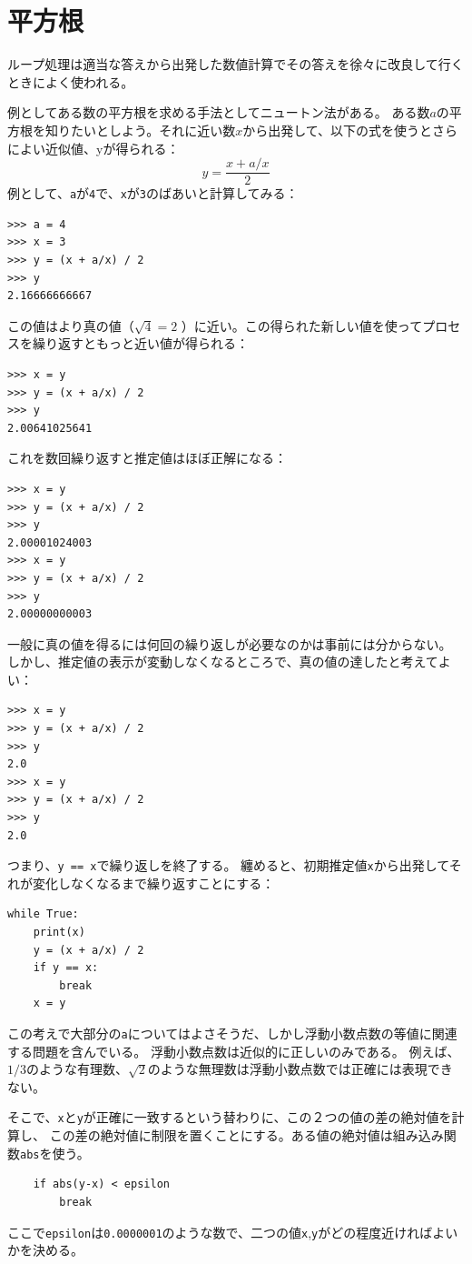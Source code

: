 \documentclass[a4j,12pt,makeidx]{jbook}
\begin{document}
\section{平方根}
ループ処理は適当な答えから出発した数値計算でその答えを徐々に改良して行くときによく使われる。\par
例としてある数の平方根を求める手法としてニュートン法がある。
ある数$a$の平方根を知りたいとしよう。それに近い数$x$から出発して、以下の式を使うとさらによい近似値、yが得られる：
\[ y = \frac{x + a/x}{2} \]
 例として、{\tt a}が{\tt 4}で、{\tt x}が{\tt 3}のばあいと計算してみる：
 \begin{verbatim}
>>> a = 4
>>> x = 3
>>> y = (x + a/x) / 2
>>> y
2.16666666667
\end{verbatim}
この値はより真の値（$\sqrt{4} = 2$ ）に近い。この得られた新しい値を使ってプロセスを繰り返すともっと近い値が得られる：
\begin{verbatim}
>>> x = y
>>> y = (x + a/x) / 2
>>> y
2.00641025641
\end{verbatim}
これを数回繰り返すと推定値はほぼ正解になる：
\begin{verbatim}
>>> x = y
>>> y = (x + a/x) / 2
>>> y
2.00001024003
>>> x = y
>>> y = (x + a/x) / 2
>>> y
2.00000000003
\end{verbatim}
%
一般に真の値を得るには何回の繰り返しが必要なのかは事前には分からない。
しかし、推定値の表示が変動しなくなるところで、真の値の達したと考えてよい：
\begin{verbatim}
>>> x = y
>>> y = (x + a/x) / 2
>>> y
2.0
>>> x = y
>>> y = (x + a/x) / 2
>>> y
2.0
\end{verbatim}
%
つまり、{\tt y == x}で繰り返しを終了する。
纏めると、初期推定値{\tt x}から出発してそれが変化しなくなるまで繰り返すことにする：
\begin{verbatim}
while True:
    print(x)
    y = (x + a/x) / 2
    if y == x:
        break
    x = y
\end{verbatim} \par
この考えで大部分の{\tt a}についてはよさそうだ、しかし浮動小数点数の等値に関連する問題を含んでいる。
浮動小数点数は近似的に正しいのみである。
例えば、{$1/3$}のような有理数、$\sqrt{2}$のような無理数は浮動小数点数では正確には表現できない。\par
そこで、{\tt x}と{\tt y}が正確に一致するという替わりに、この２つの値の差の絶対値を計算し、
この差の絶対値に制限を置くことにする。ある値の絶対値は組み込み関数{\tt abs}を使う。
\begin{verbatim}
    if abs(y-x) < epsilon
        break
\end{verbatim}
ここで{\tt epsilon}は{\tt 0.0000001}のような数で、二つの値{\tt x},{\tt y}がどの程度近ければよいかを決める。
%
\end{document}
